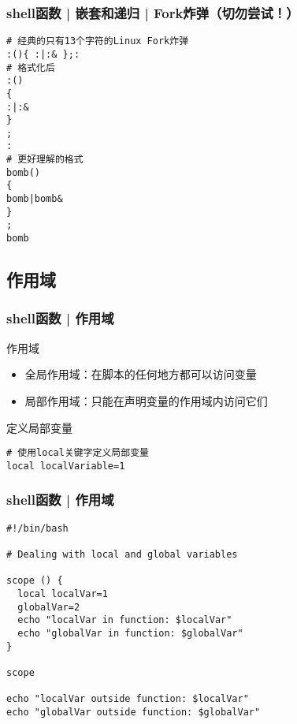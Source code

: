 \begin{frame}[fragile]
  \frametitle{shell函数 | 嵌套和递归 | Fork炸弹（\alert{切勿尝试！}）}
  \vspace{-0.5em}
\begin{lstlisting}
# 经典的只有13个字符的Linux Fork炸弹
:(){ :|:& };:
# 格式化后
:()
{
:|:&
}
;
:
# 更好理解的格式
bomb()
{
bomb|bomb&
}
;
bomb
\end{lstlisting}
\end{frame}

\subsection{作用域}
\begin{frame}[fragile]
  \frametitle{shell函数 | \alert{作用域}}
  \begin{block}{作用域}
    \begin{itemize}
      \item 全局作用域：在脚本的任何地方都可以访问变量
      \item 局部作用域：只能在声明变量的作用域内访问它们
    \end{itemize}
  \end{block}
  \begin{block}{定义局部变量}
\begin{lstlisting}
# 使用local关键字定义局部变量
local localVariable=1
\end{lstlisting}
  \end{block}
\end{frame}

\begin{frame}[fragile]
  \frametitle{shell函数 | 作用域}
\begin{lstlisting}
#!/bin/bash

# Dealing with local and global variables

scope () {
  local localVar=1
  globalVar=2
  echo "localVar in function: $localVar"
  echo "globalVar in function: $globalVar"
}

scope

echo "localVar outside function: $localVar"
echo "globalVar outside function: $globalVar"
\end{lstlisting}
\end{frame}


